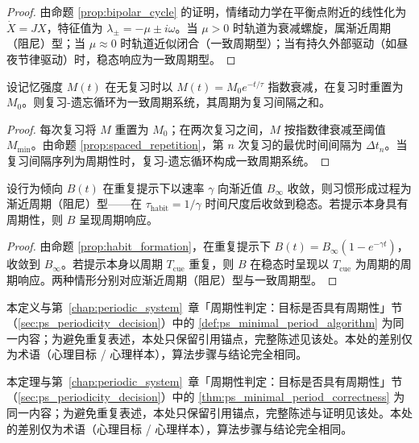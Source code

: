 \begin{proof}
由命题 \ref{prop:bipolar_cycle} 的证明，情绪动力学在平衡点附近的线性化为 $\dot X=JX$，特征值为 $\lambda_\pm=-\mu\pm i\omega$。当 $\mu>0$ 时轨道为衰减螺旋，属渐近周期（阻尼）型；当 $\mu\approx 0$ 时轨道近似闭合（一致周期型）；当有持久外部驱动（如昼夜节律驱动）时，稳态响应为一致周期型。
\end{proof}

\begin{lemma}[遗忘曲线的周期判定]\label{lem:memory_periodic}
设记忆强度 $M(t)$ 在无复习时以 $M(t)=M_0 e^{-t/\tau}$ 指数衰减，在复习时重置为 $M_0$。则复习-遗忘循环为一致周期系统，其周期为复习间隔之和。
\end{lemma}

\begin{proof}
每次复习将 $M$ 重置为 $M_0$；在两次复习之间，$M$ 按指数律衰减至阈值 $M_{\min}$。由命题 \ref{prop:spaced_repetition}，第 $n$ 次复习的最优时间间隔为 $\Delta t_n$。当复习间隔序列为周期性时，复习-遗忘循环构成一致周期系统。
\end{proof}

\begin{lemma}[习惯形成的周期判定]\label{lem:habit_periodic}
设行为倾向 $B(t)$ 在重复提示下以速率 $\gamma$ 向渐近值 $B_\infty$ 收敛，则习惯形成过程为渐近周期（阻尼）型——在 $\tau_{\text{habit}}=1/\gamma$ 时间尺度后收敛到稳态。若提示本身具有周期性，则 $B$ 呈现周期响应。
\end{lemma}

\begin{proof}
由命题 \ref{prop:habit_formation}，在重复提示下 $B(t)=B_\infty(1-e^{-\gamma t})$，收敛到 $B_\infty$。若提示本身以周期 $T_{\text{cue}}$ 重复，则 $B$ 在稳态时呈现以 $T_{\text{cue}}$ 为周期的周期响应。两种情形分别对应渐近周期（阻尼）型与一致周期型。
\end{proof}

\begin{definition}[心理最小正周期算法]\label{def:psych_minimal_period_algorithm}
本定义与第~\ref{chap:periodic_system}~章「周期性判定：目标是否具有周期性」节（\cref{sec:ps_periodicity_decision}）中的 \cref{def:ps_minimal_period_algorithm} 为同一内容；为避免重复表述，本处只保留引用锚点，完整陈述见该处。本处的差别仅为术语（心理目标 / 心理样本），算法步骤与结论完全相同。
\end{definition}

\begin{theorem}[心理最小正周期算法的正确性]\label{thm:psych_minimal_period_correctness}
本定理与第~\ref{chap:periodic_system}~章「周期性判定：目标是否具有周期性」节（\cref{sec:ps_periodicity_decision}）中的 \cref{thm:ps_minimal_period_correctness} 为同一内容；为避免重复表述，本处只保留引用锚点，完整陈述与证明见该处。本处的差别仅为术语（心理目标 / 心理样本），算法步骤与结论完全相同。
\end{theorem}

